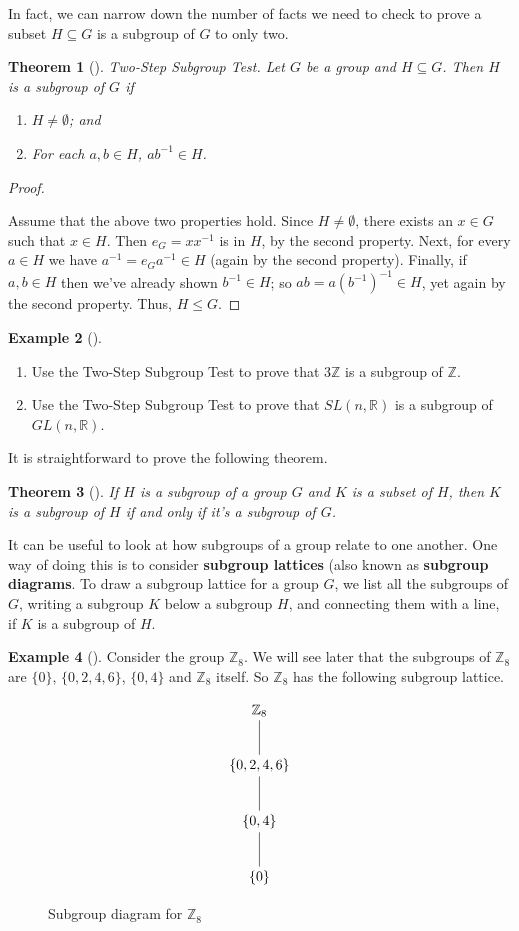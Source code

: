 \documentclass[10pt,]{book}
\newcommand{\terminology}[1]{\textbf{#1}}
\theoremstyle{plain}
\newtheorem{theorem}{Theorem}[section]
\theoremstyle{definition}
\theoremstyle{definition}
\theoremstyle{definition}
\newtheorem{example}[theorem]{Example}
\theoremstyle{definition}
\numberwithin{equation}{section}
\def\Z{\mathbb{Z}}
\def\R{\mathbb{R}}
\begin{document}
In fact, we can narrow down the number of facts we need to check to prove a subset \(H\subseteq G\) is a subgroup of \(G\) to only two.%
\begin{theorem}[{}]\label{twostep}
\emph{Two-Step Subgroup Test.} Let \(G\) be a group and \(H\subseteq G\). Then \(H\) is a subgroup of \(G\) if%
\leavevmode%
\begin{enumerate}
\item\hypertarget{li-199}{}\(H\neq \emptyset\); and%
\item\hypertarget{li-200}{}For each \(a,b\in H\), \(ab^{-1}\in H\).%
\end{enumerate}
\end{theorem}
\begin{proof}\hypertarget{proof-19}{}
Assume that the above two properties hold. Since \(H\neq
\emptyset\), there exists an \(x\in G\) such that \(x\in H\). Then \(e_G=xx^{-1}\) is in \(H\), by the second property. Next, for every \(a\in H\) we have \(a^{-1}=e_Ga^{-1}\in H\) (again by the second property). Finally, if \(a,b\in H\) then we've already shown \(b^{-1}\in H\); so \(ab=a(b^{-1})^{-1}\in H\), yet again by the second property. Thus, \(H\leq G\).%
\end{proof}
\begin{example}[]\label{example-37}
\leavevmode%
\begin{enumerate}
\item\hypertarget{li-201}{}Use the Two-Step Subgroup Test to prove that \(3\Z\) is a subgroup of \(\Z\).%
\item\hypertarget{li-202}{}Use the Two-Step Subgroup Test to prove that \(SL(n,\R)\) is a subgroup of \(GL(n,\R)\).%
\end{enumerate}
\end{example}
It is straightforward to prove the following theorem.%
\begin{theorem}[{}]\label{theorem-19}
If \(H\) is a subgroup of a group \(G\) and \(K\) is a subset of \(H\), then \(K\) is a subgroup of \(H\) if and only if it's a subgroup of \(G\).%
\end{theorem}
It can be useful to look at how subgroups of a group relate to one another. One way of doing this is to consider \terminology{subgroup lattices} (also known as \terminology{subgroup diagrams}. To draw a subgroup lattice for a group \(G\), we list all the subgroups of \(G\), writing a subgroup \(K\) below a subgroup \(H\), and connecting them with a line, if \(K\) is a subgroup of \(H\).%
\begin{example}[]\label{example-38}
Consider the group \(\Z_8\). We will see later that the subgroups of \(\Z_8\) are \(\{0\}\), \(\{0,2,4,6\}\), \(\{0,4\}\) and \(\Z_8\) itself. So \(\Z_8\) has the following subgroup lattice.%
\begin{figure}
\centering
{
\[\xymatrix{&\Z_8 \ar@{-}[d]&\\ &\{0,2,4,6\}\ar@{-}[d]&\\ &\{0,4\} \ar@{-}[d]&\\ &\{0\} &}\]
}
\caption{Subgroup diagram for \(\Z_8\)\label{figure-3}}
\end{figure}
\end{example}
\end{document}
